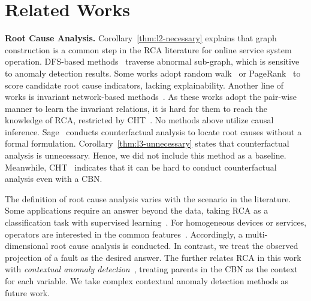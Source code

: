 \section{Related Works}\label{sec:related-work}

\noindent
\textbf{Root Cause Analysis.}
Corollary~\ref{thm:l2-necessary} explains that graph construction is a common step in the RCA literature for online service system operation.
DFS-based methods~\cite{Chen:2014,Lin:2018,Liu:2021} traverse abnormal sub-graph, which is sensitive to anomaly detection results.
Some works adopt random walk~\cite{Wang:2018,Meng:2020,Ma:2020} or PageRank~\cite{Wang:2021} to score candidate root cause indicators, lacking explainability.
Another line of works is invariant network-based methods~\cite{Cheng:2016,Ni:2017}.
As these works adopt the pair-wise manner to learn the invariant relations, it is hard for them to reach the knowledge of RCA, restricted by CHT~\cite{Bareinboim:2022}.
No methods above utilize causal inference.
Sage~\cite{Gan:2021} conducts counterfactual analysis to locate root causes without a formal formulation.
Corollary~\ref{thm:l3-unnecessary} states that counterfactual analysis is unnecessary.
Hence, we did not include this method as a baseline.
Meanwhile, CHT~\cite{Bareinboim:2022} indicates that it can be hard to conduct counterfactual analysis even with a CBN.

The definition of root cause analysis varies with the scenario in the literature.
Some applications require an answer beyond the data, taking RCA as a classification task with supervised learning~\cite{Yi:2021}.
For homogeneous devices or services, operators are interested in the common features~\cite{Zhang:2021}.
Accordingly, a multi-dimensional root cause analysis is conducted.
In contrast, we treat the observed projection of a fault as the desired answer.
The  further relates RCA in this work with \textit{contextual anomaly detection}~\cite{Chandola:2009}, treating parents in the CBN as the context for each variable.
We take complex contextual anomaly detection methods as future work.

